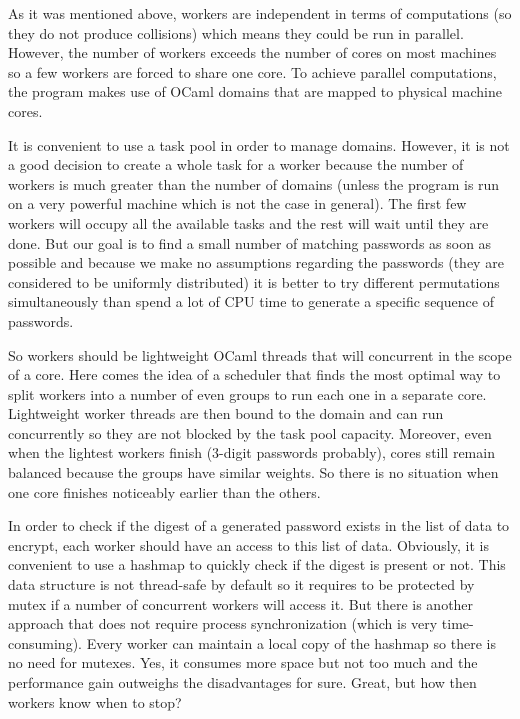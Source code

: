 \documentclass{article}
\begin{document}
As it was mentioned above, workers are independent in terms of computations (so they do not produce collisions) which means they could be run in parallel. However, the number of workers exceeds the number of cores on most machines so a few workers are forced to share one core. To achieve parallel computations, the program makes use of OCaml domains that are mapped to physical machine cores.

It is convenient to use a task pool in order to manage domains. However, it is not a good decision to create a whole task for a worker because the number of workers is much greater than the number of domains (unless the program is run on a very powerful machine which is not the case in general). The first few workers will occupy all the available tasks and the rest will wait until they are done. But our goal is to find a small number of matching passwords as soon as possible and because we make no assumptions regarding the passwords (they are considered to be uniformly distributed) it is better to try different permutations simultaneously than spend a lot of CPU time to generate a specific sequence of passwords.

So workers should be lightweight OCaml threads that will concurrent in the scope of a core. Here comes the idea of a scheduler that finds the most optimal way to split workers into a number of even groups to run each one in a separate core. Lightweight worker threads are then bound to the domain and can run concurrently so they are not blocked by the task pool capacity. Moreover, even when the lightest workers finish (3-digit passwords probably), cores still remain balanced because the groups have similar weights. So there is no situation when one core finishes noticeably earlier than the others.

In order to check if the digest of a generated password exists in the list of data to encrypt, each worker should have an access to this list of data. Obviously, it is convenient to use a hashmap to quickly check if the digest is present or not. This data structure is not thread-safe by default so it requires to be protected by mutex if a number of concurrent workers will access it. But there is another approach that does not require process synchronization (which is very time-consuming). Every worker can maintain a local copy of the hashmap so there is no need for mutexes. Yes, it consumes more space but not too much and the performance gain outweighs the disadvantages for sure. Great, but how then workers know when to stop?
\end{document}
